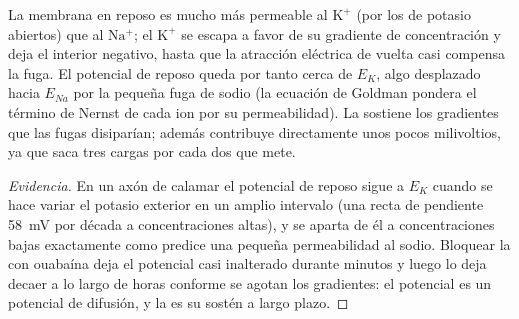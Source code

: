 \begin{proposition}\label{prop:b1:membranes-transport:resting}
La membrana en reposo es mucho más permeable al $\mathrm{K^+}$ (por los
 de potasio abiertos) que al $\mathrm{Na^+}$; el $\mathrm{K^+}$ se
escapa a favor de su gradiente de concentración y deja el interior negativo,
hasta que la atracción eléctrica de vuelta casi compensa la fuga. El
potencial de reposo queda por tanto cerca de $E_K$, algo desplazado hacia
$E_{Na}$ por la pequeña fuga de sodio (la ecuación de Goldman pondera el
término de Nernst de cada ion por su permeabilidad). La  sostiene los
gradientes que las fugas disiparían; además contribuye directamente unos
pocos milivoltios, ya que saca tres cargas por cada dos que mete.
\end{proposition}
\begin{proof}[Evidencia]
En un axón de calamar el potencial de reposo sigue a $E_K$ cuando se hace
variar el potasio exterior en un amplio intervalo (una recta de pendiente
\qty{58}{mV} por década a concentraciones altas), y se aparta de él a
concentraciones bajas exactamente como predice una pequeña permeabilidad al
sodio. Bloquear la  con ouabaína deja el potencial casi inalterado
durante minutos y luego lo deja decaer a lo largo de horas conforme se
agotan los gradientes: el potencial es un potencial de difusión, y la 
es su sostén a largo plazo.
\end{proof}

